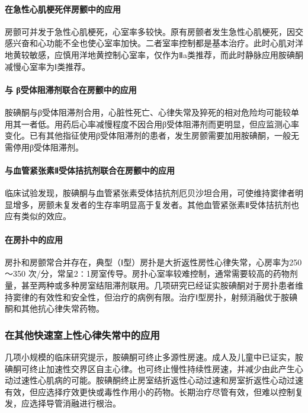 \paragraph{在急性心肌梗死伴房颤中的应用}

房颤可并发于急性心肌梗死，心室率多较快。原有房颤者发生急性心肌梗死，因交感兴奋和心功能不全也使心室率加快。二者室率控制都是基本治疗。此时心肌对洋地黄较敏感，应慎用洋地黄控制心室率，仅作为Ⅱa类推荐，而此时静脉应用胺碘酮减慢心室率为Ⅰ类推荐。

\paragraph{与 β受体阻滞剂联合在房颤中的应用}

胺碘酮与β受体阻滞剂合用，心脏性死亡、心律失常及猝死的相对危险均可能较单用其一者低。用药后心率减慢程度不因合用β受体阻滞剂而更明显，但应监测心率变化。已有其他指征使用β受体阻滞剂的患者，发生房颤需要加用胺碘酮，一般无需停用β受体阻滞剂。

\paragraph{与血管紧张素Ⅱ受体拮抗剂联合在房颤中的应用}

临床试验发现，胺碘酮与血管紧张素受体拮抗剂厄贝沙坦合用，可使维持窦律者明显增多，房颤未复发者的生存率明显高于复发者。其他血管紧张素Ⅱ受体拮抗剂也应有类似的效应。

\paragraph{在房扑中的应用}

房扑和房颤常合并存在，典型（Ⅰ型）房扑是大折返性房性心律失常，心房率为250～350
次/分，常呈2∶1房室传导。房扑心室率较难控制，通常需要较高的药物剂量，甚至两种或多种房室结阻滞剂联用。几项研究已经证实胺碘酮对于房扑患者维持窦律的有效性和安全性，但治疗的病例有限。治疗Ⅰ型房扑，射频消融优于胺碘酮和其他抗心律失常药物。

\subsubsection{在其他快速室上性心律失常中的应用}

几项小规模的临床研究提示，胺碘酮可终止多源性房速。成人及儿童中已证实，胺碘酮可终止加速性交界区自主心律。也可终止慢性持续性房速，并减少由此产生心动过速性心肌病的可能。胺碘酮终止房室结折返性心动过速和房室折返性心动过速有效，但应选择疗效更快或毒性作用小的药物。长期治疗尽管有效，但难以控制复发，应选择导管消融进行根治。

